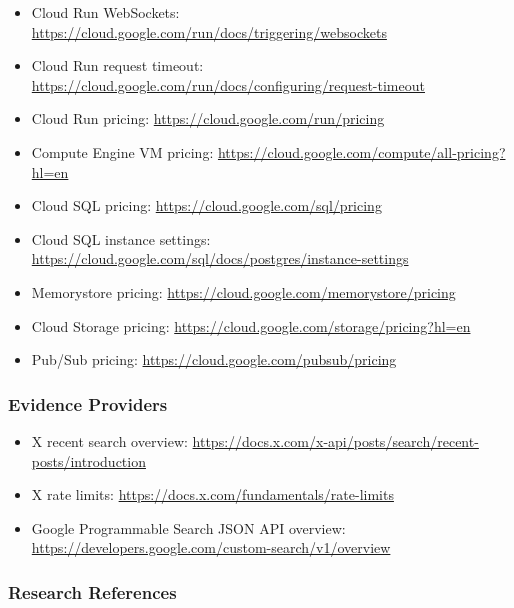 \documentclass[
]{article}
\providecommand{\tightlist}{%
  \setlength{\itemsep}{0pt}\setlength{\parskip}{0pt}}
\begin{document}
\begin{itemize}
\tightlist
\item
  Cloud Run WebSockets:
  \url{https://cloud.google.com/run/docs/triggering/websockets}
\item
  Cloud Run request timeout:
  \url{https://cloud.google.com/run/docs/configuring/request-timeout}
\item
  Cloud Run pricing: \url{https://cloud.google.com/run/pricing}
\item
  Compute Engine VM pricing:
  \url{https://cloud.google.com/compute/all-pricing?hl=en}
\item
  Cloud SQL pricing: \url{https://cloud.google.com/sql/pricing}
\item
  Cloud SQL instance settings:
  \url{https://cloud.google.com/sql/docs/postgres/instance-settings}
\item
  Memorystore pricing:
  \url{https://cloud.google.com/memorystore/pricing}
\item
  Cloud Storage pricing:
  \url{https://cloud.google.com/storage/pricing?hl=en}
\item
  Pub/Sub pricing: \url{https://cloud.google.com/pubsub/pricing}
\end{itemize}

\subsubsection{Evidence Providers}\label{evidence-providers}

\begin{itemize}
\tightlist
\item
  X recent search overview:
  \url{https://docs.x.com/x-api/posts/search/recent-posts/introduction}
\item
  X rate limits: \url{https://docs.x.com/fundamentals/rate-limits}
\item
  Google Programmable Search JSON API overview:
  \url{https://developers.google.com/custom-search/v1/overview}
\end{itemize}

\subsubsection{Research References}\label{research-references}
\end{document}
